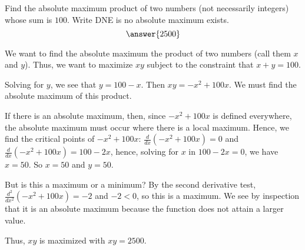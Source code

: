\documentclass{ximera}
\author{Gregory Hartman \and Matthew Carr}
\begin{document}
\begin{exercise}



Find the absolute maximum product of two numbers (not necessarily integers) whose sum is $100$. Write DNE is no absolute maximum exists. \[\answer{2500}\]


\begin{hint}
We want to find the absolute maximum the product of two numbers (call them $x$ and $y$). Thus, we want to maximize $xy$ subject to the constraint that $x+y=100$.
\end{hint}
\begin{hint}
Solving for $y$, we see that $y=100-x$. Then $xy=-x^2+100x$. We must find the absolute maximum of this product. 
\end{hint}
\begin{hint}
If there is an absolute maximum, then, since $-x^2+100x$ is defined everywhere, the absolute maximum must occur where there is a local maximum. Hence, we find the critical points of $-x^2+100x$: $\frac{d}{dx}(-x^2+100x)=0$ and $\frac{d}{dx}(-x^2+100x)=100-2x$, hence, solving for $x$ in $100-2x=0$, we have $x=50$. So $x=50$ and $y=50$.

But is this a maximum or a minimum? By the second derivative test, $\frac{d^2}{dx^2}(-x^2+100x)=-2$ and $-2<0$, so this is a maximum. We see by inspection that it is an absolute maximum because the function does not attain a larger value.

Thus, $xy$ is maximized with $xy=2500$. 
\end{hint}





\end{exercise}
\end{document}
